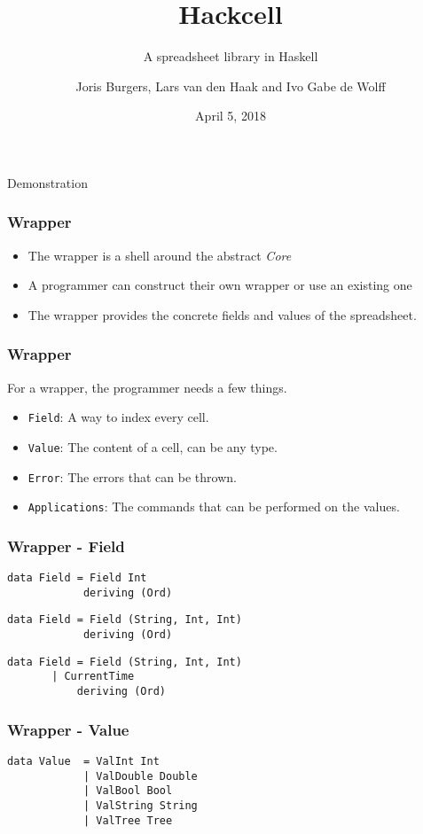 \documentclass{beamer}
\title{Hackcell}
\subtitle{A spreadsheet library in Haskell}
\author{Joris Burgers, Lars van den Haak and Ivo Gabe de Wolff}
\date{April 5, 2018}
\begin{document}
	\frame{\titlepage}
  \begin{frame}
	\begin{center}
		\huge{Demonstration}
	\end{center}
  \end{frame}

  \begin{frame}
  		\frametitle{Wrapper}
		\begin{itemize}  		
  			\item The wrapper is a shell around the abstract \textit{Core}
  			\item A programmer can construct their own wrapper or use an existing one
  			\item The wrapper provides the concrete fields and values of the spreadsheet.
  		\end{itemize}
  \end{frame}
  \begin{frame}
  		\frametitle{Wrapper}
  		For a wrapper, the programmer needs a few things.
  		\begin{itemize}
  			\item \texttt{Field}: A way to index every cell.
  			\item \texttt{Value}: The content of a cell, can be any type.
  			\item \texttt{Error}: The errors that can be thrown.
  			\item \texttt{Applications}: The commands that can be performed on the values.
  		\end{itemize}
  \end{frame}
  \begin{frame}[fragile]
  		\frametitle{Wrapper - Field}
  		\begin{verbatim}
data Field = Field Int
            deriving (Ord)
  		\end{verbatim}
  		\pause
		\begin{verbatim}
data Field = Field (String, Int, Int)
            deriving (Ord)
  		\end{verbatim}  		
  		\pause
  		\begin{verbatim}
data Field = Field (String, Int, Int)
	   | CurrentTime
           deriving (Ord)
        \end{verbatim} 
  \end{frame}
\begin{frame}[fragile]
  		\frametitle{Wrapper - Value}
  		\begin{verbatim}
data Value  = ValInt Int
            | ValDouble Double
            | ValBool Bool
            | ValString String
            | ValTree Tree
  		\end{verbatim}
  \end{frame}
\end{document}
